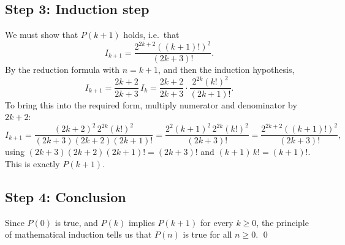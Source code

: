 \documentclass{article}
\begin{document}
\subsection*{Step 3: Induction step}

We must show that $P(k + 1)$ holds, i.e.\ that
\[
  I_{k+1} = \frac{2^{2k+2} ((k + 1)!)^2}{(2k + 3)!}.
\]
By the reduction formula with $n = k + 1$, and then the induction hypothesis,
\[
  I_{k+1} = \frac{2k + 2}{2k + 3} \, I_k
          = \frac{2k + 2}{2k + 3} \cdot \frac{2^{2k} (k!)^2}{(2k + 1)!}.
\]
To bring this into the required form, multiply numerator and denominator by
$2k + 2$:
\[
  I_{k+1} = \frac{(2k + 2)^2 \, 2^{2k} (k!)^2}{(2k + 3)(2k + 2)(2k + 1)!}
          = \frac{2^2 (k + 1)^2 \, 2^{2k} (k!)^2}{(2k + 3)!}
          = \frac{2^{2k+2} ((k + 1)!)^2}{(2k + 3)!},
\]
using $(2k + 3)(2k + 2)(2k + 1)! = (2k + 3)!$ and $(k + 1) \, k! = (k + 1)!$.
This is exactly $P(k + 1)$.

\subsection*{Step 4: Conclusion}

Since $P(0)$ is true, and $P(k)$ implies $P(k + 1)$ for every $k \ge 0$, the
principle of mathematical induction tells us that $P(n)$ is true for all
$n \ge 0$. \qed
\end{document}
